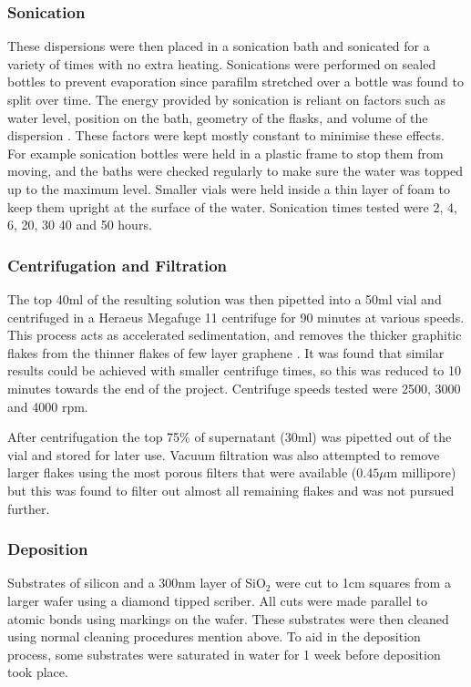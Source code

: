 \documentclass[12pt,titlepage]{article}
\begin{document}
	\subsubsection{Sonication}
	These dispersions were then placed in a sonication bath and sonicated for a variety of times with no extra heating. Sonications were performed on sealed bottles to prevent evaporation since parafilm stretched over a bottle was found to split over time. The energy provided by sonication is reliant on factors such as water level, position on the bath, geometry of the flasks, and volume of the dispersion \cite{ONeill2011}. These factors were kept mostly constant to minimise these effects. For example sonication bottles were held in a plastic frame to stop them from moving, and the baths were checked regularly to make sure the water was topped up to the maximum level. Smaller vials were held inside a thin layer of foam to keep them upright at the surface of the water. Sonication times tested were 2, 4, 6, 20, 30 40 and 50 hours.
	
	\subsubsection{Centrifugation and Filtration}
	The top 40ml of the resulting solution was then pipetted into a 50ml vial and centrifuged in a  Heraeus Megafuge 11 centrifuge for 90 minutes at various speeds. This process acts as accelerated sedimentation, and removes the thicker graphitic flakes from the thinner flakes of few layer graphene \cite{Hasan2010}. It was found that similar results could be achieved with smaller centrifuge times, so this was reduced to 10 minutes towards the end of the project. Centrifuge speeds tested were 2500, 3000 and 4000 rpm. 
	
	After centrifugation the top 75\% of supernatant (30ml) was pipetted out of the vial and stored for later use. Vacuum filtration was also attempted to remove larger flakes using the most porous filters that were available ($0.45\mu$m millipore) but this was found to filter out almost all remaining flakes and was not pursued further.
	
	\subsubsection{Deposition}
	Substrates of silicon and a 300nm layer of SiO$_2$ were cut to 1cm squares from a larger wafer using a diamond tipped scriber. All cuts were made parallel to atomic bonds using markings on the wafer. These substrates were then cleaned using normal cleaning procedures mention above. To aid in the deposition process, some substrates were saturated in water for 1 week before deposition took place.
	
\end{document}
